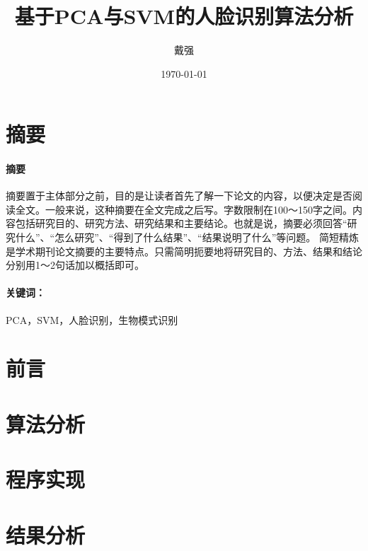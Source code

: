 \documentclass{ctexart}
\title{基于PCA与SVM的人脸识别算法分析}
\author{戴强}
\date{\today}
\renewenvironment*{abstract}[1]{%
\newcommand\gjc{#1}
\paragraph{摘要}
}{\paragraph{关键词：}\gjc }
\begin{document}
\maketitle

\section{摘要}
\label{sec:zhaiyao}

\begin{abstract}{PCA，SVM，人脸识别，生物模式识别}
摘要置于主体部分之前，目的是让读者首先了解一下论文的内容，以便决定是否阅读全文。一般来说，这种摘要在全文完成之后写。字数限制在100～150字之间。内容包括研究目的、研究方法、研究结果和主要结论。也就是说，摘要必须回答“研究什么”、“怎么研究”、“得到了什么结果”、“结果说明了什么”等问题。
简短精炼是学术期刊论文摘要的主要特点。只需简明扼要地将研究目的、方法、结果和结论分别用1～2句话加以概括即可。
\end{abstract}


\newpage

\tableofcontents


\section{前言}
\label{sec:qianyan}

\section{算法分析}

\section{程序实现}
\label{sec:shixian}

\section{结果分析}
\label{sec:jieguofenxi}
\end{document}

